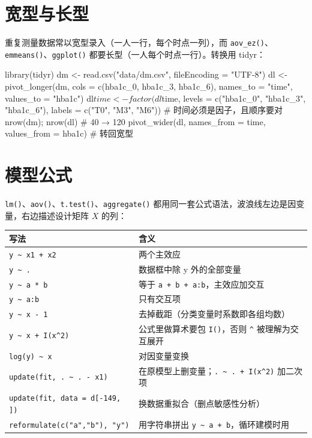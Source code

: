 \section{宽型与长型}
重复测量数据常以宽型录入（一人一行，每个时点一列），而 \Verb|aov_ez()|、\Verb|emmeans()|、\Verb|ggplot()| 都要长型（一人每个时点一行）。转换用 tidyr：

\begin{rcode}
library(tidyr)
dm <- read.csv("data/dm.csv", fileEncoding = "UTF-8")
dl <- pivot_longer(dm, cols = c(hba1c_0, hba1c_3, hba1c_6),
                   names_to = "time", values_to = "hba1c")
dl$time <- factor(dl$time, levels = c("hba1c_0", "hba1c_3", "hba1c_6"),
                  labels = c("T0", "M3", "M6"))       # 时间必须是因子，且顺序要对
nrow(dm); nrow(dl)                                    # 40 → 120
pivot_wider(dl, names_from = time, values_from = hba1c)   # 转回宽型
\end{rcode}

\section{模型公式}
\Verb|lm()|、\Verb|aov()|、\Verb|t.test()|、\Verb|aggregate()| 都用同一套公式语法，波浪线左边是因变量，右边描述设计矩阵 $X$ 的列：


\begin{tabular}{ll}
\toprule
写法 & 含义\\
\midrule
\Verb|y ~ x1 + x2| & 两个主效应\\
\Verb|y ~ .| & 数据框中除 y 外的全部变量\\
\Verb|y ~ a * b| & 等于 \Verb|a + b + a:b|，主效应加交互\\
\Verb|y ~ a:b| & 只有交互项\\
\Verb|y ~ x - 1| & 去掉截距（分类变量时系数即各组均数）\\
\Verb|y ~ x + I(x^2)| & 公式里做算术要包 \Verb|I()|，否则 \Verb|^| 被理解为交互展开\\
\Verb|log(y) ~ x| & 对因变量变换\\
\Verb|update(fit, . ~ . - x1)| & 在原模型上删变量；\Verb|. ~ . + I(x^2)| 加二次项\\
\Verb|update(fit, data = d[-149, ])| & 换数据重拟合（删点敏感性分析）\\
\Verb|reformulate(c("a","b"), "y")| & 用字符串拼出 \Verb|y ~ a + b|，循环建模时用\\
\bottomrule
\end{tabular}


